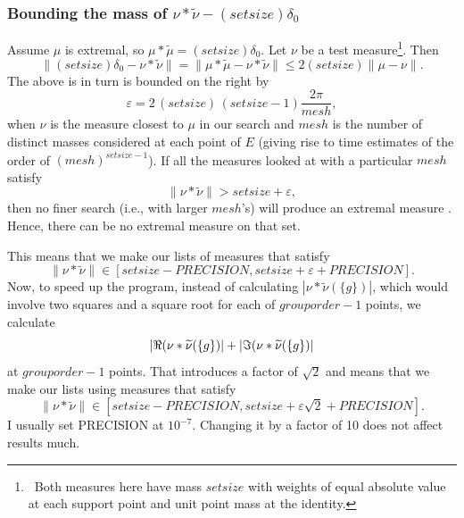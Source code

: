 \documentclass[letter,11pt]{amsart}
\numberwithin{theorem}{section}
\theoremstyle{remark}
\numberwithin{equation}{section}
\begin{document}
 \subsubsection*{Bounding the mass of $\nu*\widetilde\nu-(setsize)\delta_0$} 
 
Assume $\mu$ is extremal, so $\mu*\widetilde\mu = (setsize)\delta_0$. 
Let $\nu$ be a test measure\footnote{\ Both measures here have mass $setsize$ with weights of equal 
absolute value at each support point and unit point mass at the identity.}. Then
  \begin{equation}\label{eqClose1} 
  \|(setsize)\delta_0-\nu*\widetilde\nu \| =\|\mu*\tilde\mu -\nu*\tilde\nu\|\le 2 (setsize) \|\mu-\nu\|.  
  \end{equation}
The above is in turn is bounded on the right by
\begin{equation}\label{eqClose2}
\varepsilon =
2 \,(setsize)\, (setsize -1) \frac{2\pi }{mesh},     
\end{equation}
when $\nu$ is the measure closest to $\mu$ in our search
and $mesh$ is the number of distinct masses considered at each point of $E$ (giving rise to time estimates
of the order of $(mesh)^{setsize-1}$).
If all the measures looked at with a particular $mesh$ satisfy
\begin{equation}\|\nu*\widetilde\nu\| > setsize + \varepsilon,
\end{equation}
then no finer search (i.e., with larger $mesh$'s) will produce an extremal measure . Hence, 
there can be no extremal measure on that set.

This means that we make our lists of measures that satisfy
\[
\|\nu *\widetilde\nu\| \in [setsize-PRECISION, setsize +\varepsilon+PRECISION].
\]
Now, to speed up the program, instead of calculating $|\nu*\widetilde\nu(\{g\})|$,
which would involve two squares and a square root for each of $grouporder-1$ points,
we calculate 
\[
|\Re {(}\nu*\widetilde\nu(\{g\}{)}| + |\Im{(}\nu*\widetilde\nu(\{g\}{)}|
\]
at $grouporder-1$ points.
 That introduces a factor of
$\sqrt{2}$
and means that we make our lists using measures that satisfy
\[
\|\nu *\widetilde\nu\| \in [setsize-PRECISION, setsize +\varepsilon\sqrt2+PRECISION].
\]
I usually set PRECISION at $10^{-7}$. Changing it by a factor of 10 does not affect results much.
\end{document}
